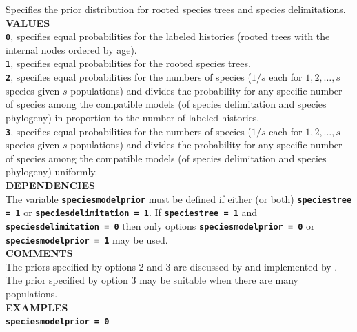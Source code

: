 \documentclass[a4paper]{book}
\numberwithin{equation}{section} \renewcommand{\baselinestretch}{0.55}
\begin{document}
Specifies the prior distribution for rooted species trees and species delimitations. \vspace{5pt}\\
\textbf{VALUES} \vspace{5pt}\\
\textbf{\texttt{0}}, specifies equal probabilities for the labeled histories (rooted trees with the internal nodes ordered by age). \vspace{5pt}\\
\textbf{\texttt{1}}, specifies equal probabilities for the rooted species trees. \vspace{5pt}\\
\textbf{\texttt{2}}, specifies equal probabilities for the numbers of species ($1/s$ each for $1,2,\ldots,s$ species given $s$ populations) and divides the probability for any specific number of species among the compatible models (of species delimitation and species phylogeny) in proportion to the number of labeled histories. \vspace{5pt}\\
\textbf{\texttt{3}}, specifies equal probabilities for the numbers of species ($1/s$ each for $1,2,\ldots,s$ species given $s$ populations) and divides the probability for any specific number of species among the compatible models (of species delimitation and species phylogeny) uniformly. \vspace{5pt}\\
\textbf{DEPENDENCIES} \vspace{5pt}\\
The variable \textbf{\texttt{speciesmodelprior}} must be defined if either (or both) \textbf{\texttt{speciestree = 1}} or \textbf{\texttt{speciesdelimitation = 1}}. If \textbf{\texttt{speciestree = 1}} and \textbf{\texttt{speciesdelimitation = 0}} then only options \textbf{\texttt{speciesmodelprior = 0}} or \textbf{\texttt{speciesmodelprior = 1}} may be used.\vspace{5pt}\\
\textbf{COMMENTS} \vspace{5pt}\\
The priors specified by options 2 and 3 are discussed by
\cite{Yang2014a} and implemented by \cite{Yang2015}. The prior
specified by option 3 may be
suitable when there are many populations. \vspace{5pt}\\
\textbf{EXAMPLES} \vspace{5pt}\\
\textbf{\texttt{speciesmodelprior = 0}} \vspace{5pt}\\
\end{document}
